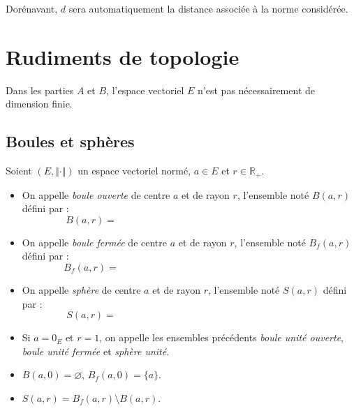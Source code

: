 \documentclass[french,11pt,twoside]{VcCours}
\begin{document}
\medskip

Dorénavant, $d$ sera automatiquement la distance associée à la norme considérée.

%


\section{Rudiments de topologie}

Dans les parties $A$ et $B$, l'espace vectoriel $E$ n'est pas nécessairement de dimension finie.
 
\subsection{Boules et sphères}
\begin{Definition}{} Soient $(E, \Vert \cdot \Vert)$ un espace vectoriel normé, $a \in E$ et $r \in \mathbb{R}_+$.

\begin{itemize}
\item On appelle \emph{boule ouverte} de centre $a$ et de rayon $r$, l'ensemble noté $B(a,r)$ défini par :
$$ B(a,r) = \phantom{\lbrace x \in E, \, d(x,a)<r \rbrace =  \lbrace x \in E, \, \Vert x-a \Vert <r \rbrace}$$
\item On appelle \emph{boule fermée} de centre $a$ et de rayon $r$, l'ensemble noté $B_f(a,r)$ défini par :
$$ B_f(a,r) = \phantom{\lbrace x \in E, \, d(x,a) \leq r \rbrace =  \lbrace x \in E, \, \Vert x-a \Vert \leq r \rbrace}$$
\item On appelle \emph{sphère} de centre $a$ et de rayon $r$, l'ensemble noté $S(a,r)$ défini par :
$$ S(a,r) = \phantom{\lbrace x \in E, \, d(x,a) = r \rbrace =  \lbrace x \in E, \, \Vert x-a \Vert = r \rbrace}$$
\item Si $a=0_E$ et $r=1$, on appelle les ensembles précédents \emph{boule unité ouverte}, \emph{boule unité fermée} et \emph{sphère unité}. 
\end{itemize}
\end{Definition}

\begin{Remarques}{}
\begin{itemize}
\item $B(a,0) = \varnothing$, $B_f(a,0) = \lbrace a \rbrace$.
\item $S(a,r)= B_f(a,r) \setminus B(a,r)$.
\end{itemize}
\end{Remarques}{}
\end{document}
